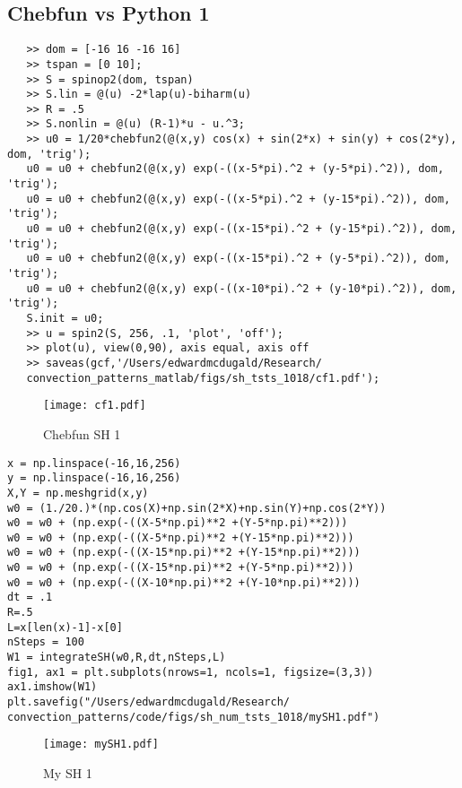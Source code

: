 \documentclass[12pt]{article}
\begin{document}
\subsection{Chebfun vs Python 1}
\begin{verbatim}
   >> dom = [-16 16 -16 16]
   >> tspan = [0 10];
   >> S = spinop2(dom, tspan)
   >> S.lin = @(u) -2*lap(u)-biharm(u)
   >> R = .5
   >> S.nonlin = @(u) (R-1)*u - u.^3;
   >> u0 = 1/20*chebfun2(@(x,y) cos(x) + sin(2*x) + sin(y) + cos(2*y), dom, 'trig');
   u0 = u0 + chebfun2(@(x,y) exp(-((x-5*pi).^2 + (y-5*pi).^2)), dom, 'trig');
   u0 = u0 + chebfun2(@(x,y) exp(-((x-5*pi).^2 + (y-15*pi).^2)), dom, 'trig');
   u0 = u0 + chebfun2(@(x,y) exp(-((x-15*pi).^2 + (y-15*pi).^2)), dom, 'trig');
   u0 = u0 + chebfun2(@(x,y) exp(-((x-15*pi).^2 + (y-5*pi).^2)), dom, 'trig');
   u0 = u0 + chebfun2(@(x,y) exp(-((x-10*pi).^2 + (y-10*pi).^2)), dom, 'trig');
   S.init = u0;
   >> u = spin2(S, 256, .1, 'plot', 'off');
   >> plot(u), view(0,90), axis equal, axis off
   >> saveas(gcf,'/Users/edwardmcdugald/Research/
   convection_patterns_matlab/figs/sh_tsts_1018/cf1.pdf');
\end{verbatim}
 \begin{figure}[ht]
        \centering
        \texttt{[image: cf1.pdf]}
        \caption{Chebfun SH 1}
    \end{figure}
\FloatBarrier
\begin{verbatim}
x = np.linspace(-16,16,256)
y = np.linspace(-16,16,256)
X,Y = np.meshgrid(x,y)
w0 = (1./20.)*(np.cos(X)+np.sin(2*X)+np.sin(Y)+np.cos(2*Y))
w0 = w0 + (np.exp(-((X-5*np.pi)**2 +(Y-5*np.pi)**2)))
w0 = w0 + (np.exp(-((X-5*np.pi)**2 +(Y-15*np.pi)**2)))
w0 = w0 + (np.exp(-((X-15*np.pi)**2 +(Y-15*np.pi)**2)))
w0 = w0 + (np.exp(-((X-15*np.pi)**2 +(Y-5*np.pi)**2)))
w0 = w0 + (np.exp(-((X-10*np.pi)**2 +(Y-10*np.pi)**2)))
dt = .1
R=.5
L=x[len(x)-1]-x[0]
nSteps = 100
W1 = integrateSH(w0,R,dt,nSteps,L)
fig1, ax1 = plt.subplots(nrows=1, ncols=1, figsize=(3,3))
ax1.imshow(W1)
plt.savefig("/Users/edwardmcdugald/Research/
convection_patterns/code/figs/sh_num_tsts_1018/mySH1.pdf")
\end{verbatim}
 \begin{figure}[ht]
        \centering
        \texttt{[image: mySH1.pdf]}
        \caption{My SH 1}
    \end{figure}
\FloatBarrier
\end{document}
